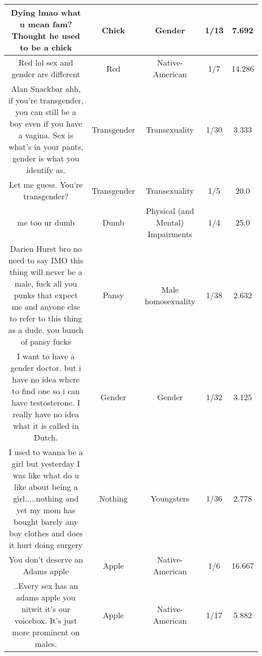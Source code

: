 \documentclass[11pt]{article}
\newlength\mylength
\begin{document}
\begin{center}
\begin{longtable}{|C{.40\mylength}|C{.30\mylength}|C{.15\mylength}|C{.15\mylength}|C{.15\mylength}|}
   Dying lmao what u mean fam? Thought he used to be a chick  & Chick & Gender & 1/13 & 7.692 \\  \hline
   Red lol sex and gender are different  & Red & Native-American & 1/7 & 14.286 \\  \hline
   Alan Snackbar ahh, if you're transgender, you can still be a boy even if you have a vagina. Sex is what's in your pants, gender is what you identify as.  & Transgender & Transexuality & 1/30 & 3.333 \\  \hline
  Let me guess. You're transgender?  & Transgender & Transexuality & 1/5 & 20.0 \\  \hline
  me too ur dumb  & Dumb & Physical (and Mental) Impairments & 1/4 & 25.0 \\  \hline
   Darien Hurst bro no need to say  IMO  this thing will never be a male, fuck all you punks that expect me and anyone else to refer to this thing as a dude.  you bunch of pansy fucks  & Pansy & Male homosexuality & 1/38 & 2.632 \\  \hline
  I want to have a gender doctor. but i have no idea where to find one so i can have testosterone. I really have no idea what it is called in Dutch.  & Gender & Gender & 1/32 & 3.125 \\  \hline
  I used to wanna be a girl but yesterday I was like what do u like about being a girl.....nothing and yet my mom has bought barely any boy clothes and does it hurt doing surgery  & Nothing & Youngsters & 1/36 & 2.778 \\  \hline
  You don't deserve an Adams apple  & Apple & Native-American & 1/6 & 16.667 \\  \hline
  ..Every sex has an adams apple you nitwit it's our voicebox. It's just more prominent on males.  & Apple & Native-American & 1/17 & 5.882 \\  \hline

\end{longtable}
\end{center}
\end{document}

